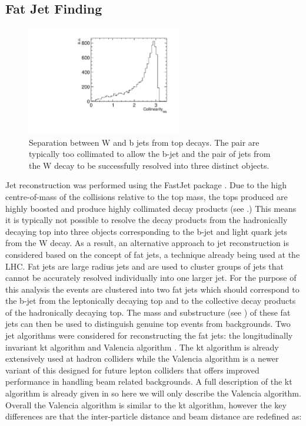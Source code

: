 \subsection{Fat Jet Finding}

\begin{figure}
  \centering
  \includegraphics[width=0.6\textwidth]{TopAnalysis/figures/WBCollinearity.pdf}
  \caption[Separation between W and b jet from top decay]{Separation between W and b jets from top decays. The pair are typically too collimated to allow the b-jet and the pair of jets from the W decay to be successfully resolved into three distinct objects.}
  \label{fig:Collimated}
\end{figure}

Jet reconstruction was performed using the FastJet package \cite{Cacciari:2011ma}. Due to the high centre-of-mass of the collisions relative to the top mass, the tops produced are highly boosted and produce highly collimated decay products (see .) This means it is typically not possible to resolve the decay products from the hadronically decaying top into three objects corresponding to the b-jet and light quark jets from the W decay. As a result, an alternative approach to jet reconstruction is considered based on the concept of fat jets, a technique already being used at the LHC\cite{Miller:2011qg}. Fat jets are large radius jets and are used to cluster groups of jets that cannot be accurately resolved individually into one larger jet. For the purpose of this analysis the events are clustered into two fat jets which should correspond to the b-jet from the leptonically decaying top and to the collective decay products of the hadronically decaying top. The mass and substructure (see ) of these fat jets can then be used to distinguish genuine top events from backgrounds. Two jet algorithms were considered for reconstructing the fat jets: the longitudinally invariant kt algorithm \cite{Cacciari:2008gp} and Valencia algorithm \cite{Boronat:2014hva}. The kt algorithm is already extensively used at hadron colliders while the Valencia algorithm is a newer variant of this designed for future lepton colliders that offers improved performance in handling beam related backgrounds. A full description of the kt algorithm is already given in  so here we will only describe the Valencia algorithm. Overall the Valencia algorithm is similar to the kt algorithm, however the key differences are that the inter-particle distance and beam distance are redefined as:

